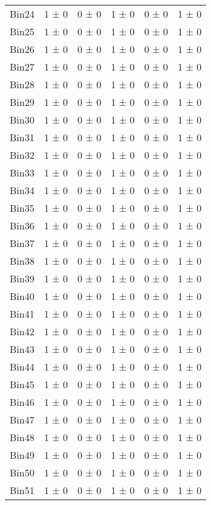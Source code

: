 \begin{tabular}{@{\extracolsep{4pt}}lccccc@{}}
     Bin24 & 1 ± 0 & 0 ± 0 & 1 ± 0 & 0 ± 0 & 1 ± 0 \\ 
     Bin25 & 1 ± 0 & 0 ± 0 & 1 ± 0 & 0 ± 0 & 1 ± 0 \\ 
     Bin26 & 1 ± 0 & 0 ± 0 & 1 ± 0 & 0 ± 0 & 1 ± 0 \\ 
     Bin27 & 1 ± 0 & 0 ± 0 & 1 ± 0 & 0 ± 0 & 1 ± 0 \\ 
     Bin28 & 1 ± 0 & 0 ± 0 & 1 ± 0 & 0 ± 0 & 1 ± 0 \\ 
     Bin29 & 1 ± 0 & 0 ± 0 & 1 ± 0 & 0 ± 0 & 1 ± 0 \\ 
     Bin30 & 1 ± 0 & 0 ± 0 & 1 ± 0 & 0 ± 0 & 1 ± 0 \\ 
     Bin31 & 1 ± 0 & 0 ± 0 & 1 ± 0 & 0 ± 0 & 1 ± 0 \\ 
     Bin32 & 1 ± 0 & 0 ± 0 & 1 ± 0 & 0 ± 0 & 1 ± 0 \\ 
     Bin33 & 1 ± 0 & 0 ± 0 & 1 ± 0 & 0 ± 0 & 1 ± 0 \\ 
     Bin34 & 1 ± 0 & 0 ± 0 & 1 ± 0 & 0 ± 0 & 1 ± 0 \\ 
     Bin35 & 1 ± 0 & 0 ± 0 & 1 ± 0 & 0 ± 0 & 1 ± 0 \\ 
     Bin36 & 1 ± 0 & 0 ± 0 & 1 ± 0 & 0 ± 0 & 1 ± 0 \\ 
     Bin37 & 1 ± 0 & 0 ± 0 & 1 ± 0 & 0 ± 0 & 1 ± 0 \\ 
     Bin38 & 1 ± 0 & 0 ± 0 & 1 ± 0 & 0 ± 0 & 1 ± 0 \\ 
     Bin39 & 1 ± 0 & 0 ± 0 & 1 ± 0 & 0 ± 0 & 1 ± 0 \\ 
     Bin40 & 1 ± 0 & 0 ± 0 & 1 ± 0 & 0 ± 0 & 1 ± 0 \\ 
     Bin41 & 1 ± 0 & 0 ± 0 & 1 ± 0 & 0 ± 0 & 1 ± 0 \\ 
     Bin42 & 1 ± 0 & 0 ± 0 & 1 ± 0 & 0 ± 0 & 1 ± 0 \\ 
     Bin43 & 1 ± 0 & 0 ± 0 & 1 ± 0 & 0 ± 0 & 1 ± 0 \\ 
     Bin44 & 1 ± 0 & 0 ± 0 & 1 ± 0 & 0 ± 0 & 1 ± 0 \\ 
     Bin45 & 1 ± 0 & 0 ± 0 & 1 ± 0 & 0 ± 0 & 1 ± 0 \\ 
     Bin46 & 1 ± 0 & 0 ± 0 & 1 ± 0 & 0 ± 0 & 1 ± 0 \\ 
     Bin47 & 1 ± 0 & 0 ± 0 & 1 ± 0 & 0 ± 0 & 1 ± 0 \\ 
     Bin48 & 1 ± 0 & 0 ± 0 & 1 ± 0 & 0 ± 0 & 1 ± 0 \\ 
     Bin49 & 1 ± 0 & 0 ± 0 & 1 ± 0 & 0 ± 0 & 1 ± 0 \\ 
     Bin50 & 1 ± 0 & 0 ± 0 & 1 ± 0 & 0 ± 0 & 1 ± 0 \\ 
     Bin51 & 1 ± 0 & 0 ± 0 & 1 ± 0 & 0 ± 0 & 1 ± 0 \\ 

\end{tabular}
